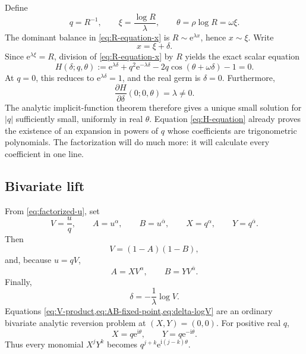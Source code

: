 \documentclass[11pt,oneside]{article}
\numberwithin{equation}{section}
\theoremstyle{plain}
\theoremstyle{definition}
\theoremstyle{remark}
\newcommand{\e}{\mathrm e}
\newcommand{\ii}{\mathrm i}
\begin{document}
Define
\begin{equation}\label{eq:q-xi-theta}
 q=R^{-1},
 \qquad
 \xi=\frac{\log R}{\lambda},
 \qquad
 \theta=\rho\log R=\omega\xi.
\end{equation}
The dominant balance in \cref{eq:R-equation-x} is
\(R\sim\e^{\lambda x}\), hence \(x\sim\xi\).  Write
\begin{equation}\label{eq:delta-def}
 x=\xi+\delta.
\end{equation}
Since \(\e^{\lambda\xi}=R\), division of
\cref{eq:R-equation-x} by \(R\) yields the exact scalar equation
\begin{equation}\label{eq:H-equation}
 H(\delta;q,\theta):=
 \e^{\lambda\delta}
 +q^2\e^{-\lambda\delta}
 -2q\cos(\theta+\omega\delta)-1=0.
\end{equation}
At \(q=0\), this reduces to \(\e^{\lambda\delta}=1\), and the real germ is
\(\delta=0\).  Furthermore,
\[
 \frac{\partial H}{\partial\delta}(0;0,\theta)=\lambda\ne0.
\]
The analytic implicit-function theorem therefore gives a unique small
solution for \(|q|\) sufficiently small, uniformly in real \(\theta\).
Equation \cref{eq:H-equation} already proves the existence of an expansion
in powers of \(q\) whose coefficients are trigonometric polynomials.  The
factorization will do much more: it will calculate every coefficient in one
line.

\subsection{Bivariate lift}

From \cref{eq:factorized-u}, set
\begin{equation}\label{eq:VABXY}
 V=\frac uq,
 \qquad
 A=u^\alpha,
 \qquad
 B=u^{\bar\alpha},
 \qquad
 X=q^\alpha,
 \qquad
 Y=q^{\bar\alpha}.
\end{equation}
Then
\begin{equation}\label{eq:V-product}
 V=(1-A)(1-B),
\end{equation}
and, because \(u=qV\),
\begin{equation}\label{eq:AB-fixed-point}
 A=XV^\alpha,
 \qquad
 B=YV^{\bar\alpha}.
\end{equation}
Finally,
\begin{equation}\label{eq:delta-logV}
 \delta=-\frac1\lambda\log V.
\end{equation}
Equations \cref{eq:V-product,eq:AB-fixed-point,eq:delta-logV} are an
ordinary bivariate analytic reversion problem at \((X,Y)=(0,0)\).
For positive real \(q\),
\begin{equation}\label{eq:X-Y-phase}
 X=q\e^{\ii\theta},
 \qquad
 Y=q\e^{-\ii\theta}.
\end{equation}
Thus every monomial \(X^jY^k\) becomes
\(q^{j+k}\e^{\ii(j-k)\theta}\).
\end{document}
